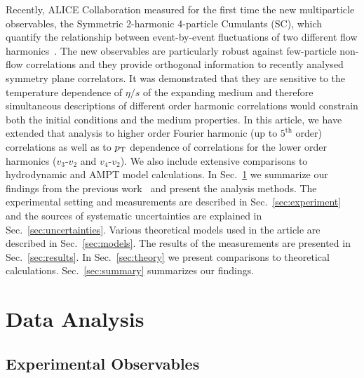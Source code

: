 \documentclass[ALICE,manyauthors]{cernphprep}
\begin{document}
Recently, ALICE Collaboration measured for the first time the new multiparticle observables, the Symmetric 2-harmonic 4-particle Cumulants (SC), which quantify the relationship between event-by-event fluctuations of two different flow harmonics~\cite{ALICE:2016kpq}. 
The new observables are particularly robust against few-particle non-flow correlations and they provide orthogonal information to recently analysed symmetry plane correlators. 
It was demonstrated that they are sensitive to the temperature dependence of $\eta/s$ of the expanding medium and therefore simultaneous descriptions of different order harmonic correlations would constrain both the initial conditions and the medium properties.
In this article, we have extended that analysis to higher order Fourier harmonic (up to $5^{\mathrm{th}}$ order) correlations as well as to $p_{\rm T}$ dependence of correlations for the lower order harmonics ($v_3$-$v_2$ and $v_4$-$v_2$).  We also include extensive comparisons to hydrodynamic and AMPT model calculations.
In Sec.~\ref{sec:method} we summarize our findings from the previous work~\cite{ALICE:2016kpq} and present the analysis methods. The experimental setting and measurements are described in Sec.~\ref{sec:experiment} and the sources of systematic uncertainties are explained in Sec.~\ref{sec:uncertainties}. Various theoretical models used in the article are described in Sec.~\ref{sec:models}. The results of the measurements are presented in Sec.~\ref{sec:results}.
 In Sec.~\ref{sec:theory} we present comparisons to theoretical calculations. Sec.~\ref{sec:summary} summarizes our findings.
 
 
\section{Data Analysis}
\label{sec:method}
\subsection{Experimental Observables}
\end{document}
